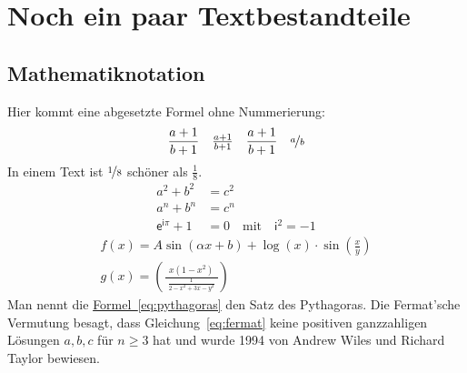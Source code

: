 

\chapter{Noch ein paar Textbestandteile}
 
 \section{Mathematiknotation}

Hier kommt eine abgesetzte Formel ohne Nummerierung:
%
\begin{align*}
\frac{a+1}{b+1} \quad \tfrac{a+1}{b+1} \quad  \dfrac{a+1}{b+1} \quad \nicefrac{a}{b}
\end{align*}
%
In einem Text ist $\nicefrac{1}{8}$ schöner als $\frac{1}{8}$. 
%	
\begin{align}
\label{eq:pythagoras} a^2 + b^2  & = c^2 \\ 
\label{eq:fermat} a^n + b^n & = c^n \\ 
\label{eq:schoen} \textsf{e}^{\textsf{i}\pi} +1 & = 0 \quad \text{mit} \quad  \textsf{i}^2  = -1   
\end{align}	
%
\begin{align}
f(x) = A \sin(\alpha x + b) + \log(x) \cdot \sin\left(\frac{x}{y}\right) \\
g(x) = \left(\frac{\ \ x (1-x^2)\ \ }{\frac{1}{2-x^2 +3x -y^2}} \right)
\end{align}
%	
Man nennt die %
  \hyperref[eq:pythagoras]{Formel~\eqref{eq:pythagoras}}
den Satz des Pythagoras. Die Fermat'sche Vermutung besagt, dass Gleichung~\eqref{eq:fermat} keine positiven ganzzahligen Lösungen $a, b, c$ für $n \ge 3$ hat und wurde 1994 von Andrew Wiles und Richard Taylor bewiesen. 

